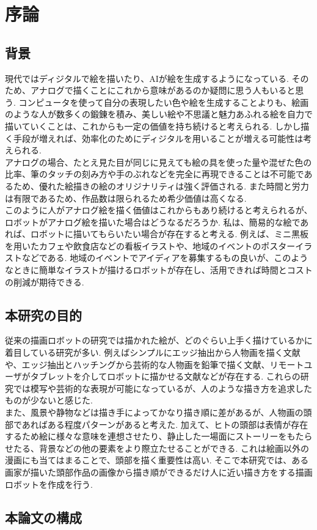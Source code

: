 \chapter{序論}
  \label{chap:intro}
  \section{背景}
    \label{sec:background}
	現代ではディジタルで絵を描いたり、AIが絵を生成するようになっている.	そのため、アナログで描くことにこれから意味があるのか疑問に思う人もいると思う. コンピュータを使って自分の表現したい色や絵を生成することよりも、絵画のような人が数多くの鍛錬を積み、美しい絵や不思議と魅力あふれる絵を自力で描いていくことは、これからも一定の価値を持ち続けると考えられる. しかし描く手段が増えれば、効率化のためにディジタルを用いることが増える可能性は考えられる.   
	\\\hspace{10pt}アナログの場合、たとえ見た目が同じに見えても絵の具を使った量や混ぜた色の比率、筆のタッチの刻み方や手のぶれなどを完全に再現できることは不可能であるため、優れた絵描きの絵のオリジナリティは強く評価される.	また時間と労力は有限であるため、作品数は限られるため希少価値は高くなる. 
	\\\hspace{10pt}このように人がアナログ絵を描く価値はこれからもあり続けると考えられるが、ロボットがアナログ絵を描いた場合はどうなるだろうか. 私は、簡易的な絵であれば、ロボットに描いてもらいたい場合が存在すると考える. 例えば、ミニ黒板を用いたカフェや飲食店などの看板イラストや、地域のイベントのポスターイラストなどである. 地域のイベントでアイディアを募集するもの良いが、このようなときに簡単なイラストが描けるロボットが存在し、活用できれば時間とコストの削減が期待できる. 
  \section{本研究の目的}
    \label{sec:target}
	従来の描画ロボットの研究では描かれた絵が、どのぐらい上手く描けているかに着目している研究が多い. 例えばシンプルにエッジ抽出から人物画を描く文献\cite{1}や、エッジ抽出とハッチングから芸術的な人物画を鉛筆で描く文献\cite{2}、リモートユーザがタブレットを介してロボットに描かせる文献\cite{3}などが存在する. これらの研究では模写や芸術的な表現が可能になっているが、人のような描き方を追求したものが少ないと感じた.
	\\\hspace{10pt}また、風景や静物などは描き手によってかなり描き順に差があるが、人物画の頭部であればある程度パターンがあると考えた.  加えて、ヒトの頭部は表情が存在するため絵に様々な意味を連想させたり、静止した一場面にストーリーをもたらせたる、背景などの他の要素をより際立たせることができる. これは絵画以外の漫画にも当てはまることで、頭部を描く重要性は高い.	そこで本研究では、ある画家が描いた頭部作品の画像から描き順ができるだけ人に近い描き方をする描画ロボットを作成を行う.\\
	

	\section{本論文の構成}
    \label{sec:construction_of_this_paper}
    
